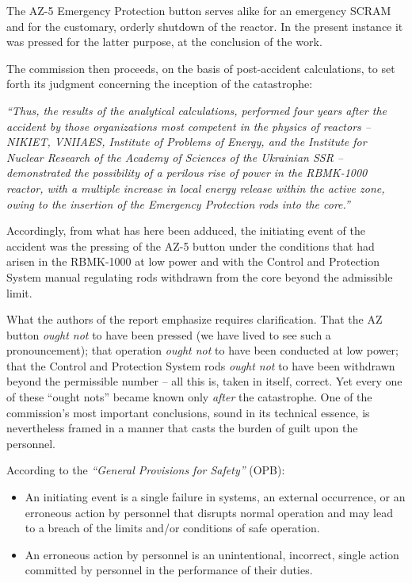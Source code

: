 \documentclass[openright]{bookest}
\begin{document}
The AZ-5 Emergency Protection button serves alike for an emergency SCRAM and for the customary, orderly shutdown of the reactor. In the present instance it was pressed for the latter purpose, at the conclusion of the work.

The commission then proceeds, on the basis of post-accident calculations, to set forth its judgment concerning the inception of the catastrophe:

\begin{personal}
\textit{``Thus, the results of the analytical calculations, performed four years after the accident by those organizations most competent in the physics of reactors -- NIKIET, VNIIAES, Institute of Problems of Energy, and the Institute for Nuclear Research of the Academy of Sciences of the Ukrainian SSR -- demonstrated the possibility of a perilous rise of power in the RBMK-1000 reactor, with a multiple increase in local energy release within the active zone, owing to the insertion of the Emergency Protection rods into the core.''}
\end{personal}

Accordingly, from what has here been adduced, the initiating event of the accident was the pressing of the AZ-5 button under the conditions that had arisen in the RBMK-1000 at low power and with the Control and Protection System manual regulating rods withdrawn from the core beyond the admissible limit.

What the authors of the report emphasize requires clarification. That the AZ button \textit{ought not} to have been pressed (we have lived to see such a pronouncement); that operation \textit{ought not} to have been conducted at low power; that the Control and Protection System rods \textit{ought not} to have been withdrawn beyond the permissible number -- all this is, taken in itself, correct. Yet every one of these ``ought nots'' became known only \textit{after} the catastrophe. One of the commission's most important conclusions, sound in its technical essence, is nevertheless framed in a manner that casts the burden of guilt upon the personnel.

According to the \textit{``General Provisions for Safety''} (OPB):

\begin{itemize}
\item An initiating event is a single failure in systems, an external occurrence, or an erroneous action by personnel that disrupts normal operation and may lead to a breach of the limits and/or conditions of safe operation.
\item An erroneous action by personnel is an unintentional, incorrect, single action committed by personnel in the performance of their duties.
\end{itemize}
\end{document}
